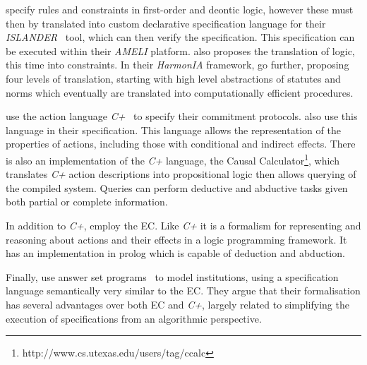 \citet{Arcos2005} specify rules and constraints in first-order and deontic
logic, however these must then by translated into custom declarative
specification language for their \emph{ISLANDER}~\citep{Esteva2002} tool,
which can then verify the specification. This specification can be executed
within their \emph{AMELI} platform. \citet{Aldewereld2006} also proposes the
translation of logic, this time into constraints. In their \emph{HarmonIA}
framework, \citet{Vazquez-Salceda2003} go further, proposing four levels of
translation, starting with high level abstractions of statutes and norms which
eventually are translated into computationally efficient procedures.

\citet{Chopra2006} use the action language \emph{C+}~\citep{Giunchiglia2004}
to specify their commitment protocols. \citet{Artikis2009} also use this
language in their specification. This language allows the representation of
the properties of actions, including those with conditional and indirect
effects. There is also an implementation of the \emph{C+} language, the Causal
Calculator\footnote{http://www.cs.utexas.edu/users/tag/ccalc}, which
translates \emph{C+} action descriptions into propositional logic then allows
querying of the compiled system. Queries can perform deductive and abductive
tasks given both partial or complete information.

In addition to \emph{C+}, \citet{Artikis2009} employ the \ac{EC}. Like
\emph{C+} it is a formalism for representing and reasoning about actions and
their effects in a logic programming framework. It has an implementation in
prolog which is capable of deduction and abduction.

Finally, \citet{Cliffe2006} use answer set programs~\citep{Baral2003} to model
institutions, using a specification language semantically very similar to the
\ac{EC}. They argue that their formalisation has several advantages over both
\ac{EC} and \emph{C+}, largely related to simplifying the execution of
specifications from an algorithmic perspective.




